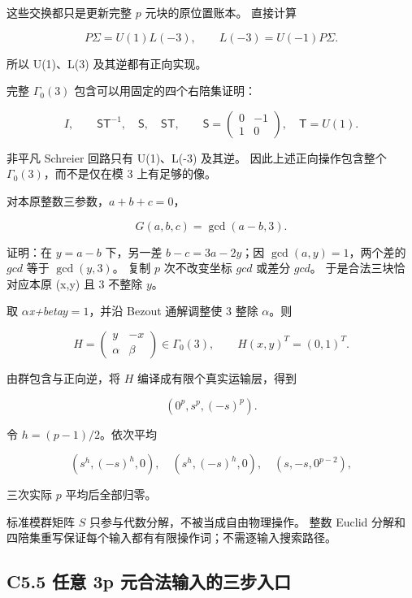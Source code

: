 \documentclass[11pt,a4paper]{article}
\theoremstyle{definition}
\numberwithin{equation}{section}
\begin{document}
{这些交换都只是更新完整} {\ensuremath{p}} {元块的原位置账本。} {直接计算}

\[
P\Sigma=U(1)L(-3),\qquad
\boxed{L(-3)=U(-1)P\Sigma.}
\tag{C5.4}
\]

{所以} {U(1)、L(3)} {及其逆都有正向实现。}

{完整} {\ensuremath{\Gamma _{0}(3)}} {包含可以用固定的四个右陪集证明：}

\[
I,\qquad \mathsf S\mathsf T^{-1},\quad\mathsf S,
\quad\mathsf S\mathsf T,
\qquad
\mathsf S=\begin{pmatrix}0&-1\\1&0\end{pmatrix},\quad\mathsf T=U(1).
\]

{非平凡} {Schreier} {回路只有} {U(1)、L(-3)} {及其逆。} {因此上述正向操作包含整个} {\ensuremath{\Gamma _{0}(3)}，而不是仅在模} {3} {上有足够的像。}

{对本原整数三参数，\ensuremath{a+b+c=0}，}

\[
G(a,b,c)=\gcd(a-b,3).
\]

{证明：在} {\ensuremath{y=a-b}} {下，另一差} {\ensuremath{b-c=3a-2y}；因} {\ensuremath{\operatorname{gcd}(a,y)=1}，两个差的} {\ensuremath{gcd}} {等于} {\ensuremath{\operatorname{gcd}(y,3)}。} {复制} {\ensuremath{p}} {次不改变坐标} {\ensuremath{gcd}} {或差分} {\ensuremath{gcd}。} {于是合法三块恰对应本原} {(x,y)} {且} {3} {不整除} {\ensuremath{y}。}

{取} {\ensuremath{\alpha }}\emph{{x+beta}}{\ensuremath{y=1}，并沿} {Bezout} {通解调整使} {3} {整除} {\ensuremath{\alpha }。则}

\[
H=\begin{pmatrix}y&-x\\\alpha&\beta\end{pmatrix}\in\Gamma_0(3),
\qquad H(x,y)^T=(0,1)^T.
\]

{由群包含与正向逆，将} {\ensuremath{H}} {编译成有限个真实运输层，得到}

\[
(0^p,s^p,(-s)^p).
\]

{令} {\ensuremath{h=(p-1)/2}。依次平均}

\[
(s^h,(-s)^h,0),\quad
(s^h,(-s)^h,0),\quad
(s,-s,0^{p-2}),
\]

{三次实际} {\ensuremath{p}} {平均后全部归零。}

{标准模群矩阵} {\ensuremath{S}} {只参与代数分解，不被当成自由物理操作。} {整数} {Euclid} {分解和四陪集重写保证每个输入都有有限操作词；不需逐输入搜索路径。}

\subsection*{\texorpdfstring{{C5.5} {任意} {3p} {元合法输入的三步入口}}{C5.5 任意 3p 元合法输入的三步入口}}\label{C5-h32}
\end{document}
